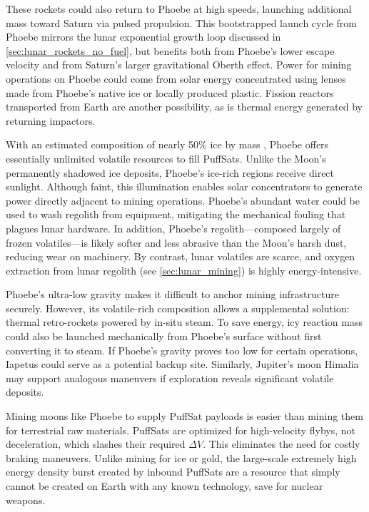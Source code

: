 \documentclass{article}
\begin{document}
These rockets could also return to Phoebe at high speeds, launching additional mass toward Saturn via pulsed propulsion. This bootstrapped launch cycle from Phoebe mirrors the lunar exponential growth loop discussed in \autoref{sec:lunar_rockets_no_fuel}, but benefits both from Phoebe’s lower escape velocity and from Saturn's larger gravitational Oberth effect. Power for mining operations on Phoebe could come from solar energy concentrated using lenses made from Phoebe's native ice or locally produced plastic. Fission reactors transported from Earth are another possibility, as is thermal energy generated by returning impactors.

With an estimated composition of nearly 50\% ice by mass \cite{phoebe}, Phoebe offers essentially unlimited volatile resources to fill PuffSats. Unlike the Moon’s permanently shadowed ice deposits, Phoebe’s ice-rich regions receive direct sunlight. Although faint, this illumination enables solar concentrators to generate power directly adjacent to mining operations. Phoebe’s abundant water could be used to wash regolith from equipment, mitigating the mechanical fouling that plagues lunar hardware. In addition, Phoebe’s regolith—composed largely of frozen volatiles—is likely softer and less abrasive than the Moon’s harsh dust, reducing wear on machinery. By contrast, lunar volatiles are scarce, and oxygen extraction from lunar regolith (see \autoref{sec:lunar_mining}) is highly energy-intensive.

Phoebe’s ultra-low gravity makes it difficult to anchor mining infrastructure securely. However, its volatile-rich composition allows a supplemental solution: thermal retro-rockets powered by in-situ steam. To save energy, icy reaction mass could also be launched mechanically from Phoebe’s surface without first converting it to steam. If Phoebe’s gravity proves too low for certain operations, Iapetus could serve as a potential backup site. Similarly, Jupiter’s moon Himalia may support analogous maneuvers if exploration reveals significant volatile deposits.

Mining moons like Phoebe to supply PuffSat payloads is easier than mining them for terrestrial raw materials. PuffSats are optimized for high-velocity flybys, not deceleration, which slashes their required $\Delta V$. This eliminates the need for costly braking maneuvers.  Unlike mining for ice or gold, the large-scale extremely high energy density burst created by inbound PuffSats are a resource that simply cannot be created on Earth with any known technology, save for nuclear weapons.
\end{document}
